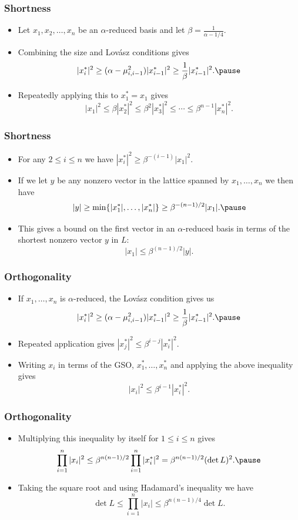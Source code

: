\documentclass{beamer}
\begin{document}
\begin{frame}
	\frametitle{Shortness}
	\begin{itemize}
		\item Let $x_1, x_2, \ldots, x_n$ be an $\alpha$-reduced basis and let $\beta = \frac{1}{\alpha - 1/4}$.\pause
		\item Combining the size and Lov\'asz conditions gives
		\[
		|x_i^*|^2 \geq (\alpha - \mu_{i,i-1}^2)|x_{i-1}^*|^2 \geq \frac{1}{\beta}|x_{i-1}^*|^2.\pause
		\]
		\item Repeatedly applying this to $x_1^* = x_1$ gives
		\[
		|x_1|^2 \leq \beta |x_2^*|^2 \leq \beta^2|x_3^*|^2 \leq \cdots \leq \beta^{n-1}|x_n^*|^2.
		\]
	\end{itemize}
\end{frame}

\begin{frame}
	\frametitle{Shortness}
	\begin{itemize}
		\item For any $2\leq i \leq n$ we have $|x_i^*|^2 \geq \beta^{-(i-1)}|x_1|^2$.\pause
		\item If we let $y$ be any nonzero vector in the lattice spanned by $x_1, \ldots, x_n$ we then have
		\[
		|y| \geq \min\{|x_1^*|, \ldots, |x_n^*|\} \geq \beta^{-(n-1)/2}|x_1|.\pause
		\]
		\item This gives a bound on the first vector in an $\alpha$-reduced basis in terms of the shortest nonzero vector $y$ in $L$:
		\[
		|x_1| \leq \beta^{(n-1)/2}|y|.
		\]
	\end{itemize}
\end{frame}

\begin{frame}
	\frametitle{Orthogonality}
	\begin{itemize}
		\item If $x_1, \ldots, x_n$ is $\alpha$-reduced, the Lov\'asz condition gives us
		\[
		|x_i^*|^2 \geq (\alpha - \mu_{i,i-1}^2)|x_{i-1}^*|^2 \geq \frac{1}{\beta}|x_{i-1}^*|^2.\pause
		\]
		\item Repeated application gives $|x_j^*|^2 \leq \beta^{i-j}|x_i^*|^2$.\pause
		\item Writing $x_i$ in terms of the GSO, $x_1^*, \ldots, x_n^*$ and applying the above inequality gives
		\[
		|x_i|^2 \leq \beta^{i-1}|x_i^*|^2.
		\]
	\end{itemize}
\end{frame}

\begin{frame}
	\frametitle{Orthogonality}
	\begin{itemize}
		\item Multiplying this inequality by itself for $1\leq i \leq n$ gives
		\[
		\prod_{i=1}^n|x_i|^2 \leq \beta^{n(n-1)/2}\prod_{i=1}^n|x_i^*|^2 = \beta^{n(n-1)/2}(\det L)^2.\pause
		\]
		\item Taking the square root and using Hadamard's inequality we have
		\[
		\det L \leq \prod_{i=1}^n|x_i| \leq \beta^{n(n-1)/4}\det L.
		\]
	\end{itemize}
\end{frame}
\end{document}
